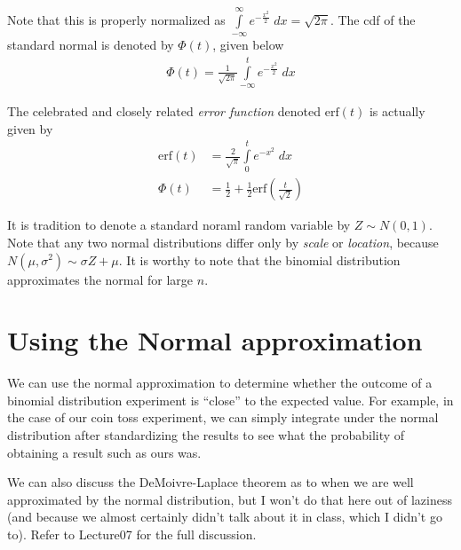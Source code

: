 \documentclass[10pt]{report}
\begin{document}
Note that this is properly normalized as $\int\limits_{-\infty}^{\infty}e^{-\frac{x^2}{2}}\;dx = \sqrt{2\pi}$. The cdf of the standard normal is denoted by $\Phi(t)$, given below
\begin{align}
    \Phi(t) = \frac{1}{\sqrt{2\pi}}\int\limits_{-\infty}^{t}e^{-\frac{x^2}{2}}\;dx
\end{align}

The celebrated and closely related \emph{error function} denoted $\mathrm{erf}(t)$ is actually given by
\begin{align}
    \mathrm{erf}(t) &= \frac{2}{\sqrt{\pi}}\int\limits_{0}^{t}e^{-x^2}\;dx\\
    \Phi(t) &= \frac{1}{2} + \frac{1}{2}\mathrm{erf}\left( \frac{t}{\sqrt{2}} \right)
\end{align}

It is tradition to denote a standard noraml random variable by $Z \sim N(0,1)$. Note that any two normal distributions differ only by \emph{scale} or \emph{location}, because $N(\mu, \sigma^2) \sim \sigma Z + \mu$. It is worthy to note that the binomial distribution approximates the normal for large $n$. 

\section{Using the Normal approximation}

We can use the normal approximation to determine whether the outcome of a binomial distribution experiment is ``close'' to the expected value. For example, in the case of our coin toss experiment, we can simply integrate under the normal distribution after standardizing the results to see what the probability of obtaining a result such as ours was.

We can also discuss the DeMoivre-Laplace theorem as to when we are well approximated by the normal distribution, but I won't do that here out of laziness (and because we almost certainly didn't talk about it in class, which I didn't go to). Refer to Lecture07 for the full discussion.
\end{document}

